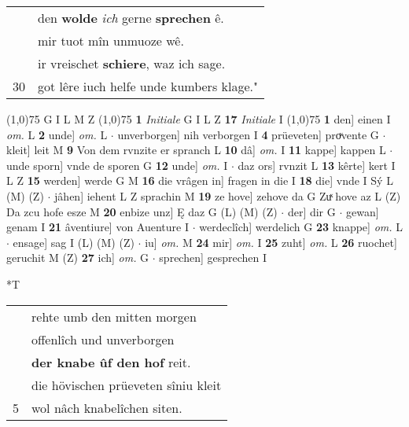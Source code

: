 \documentclass[8pt,a4paper,notitlepage]{article}
\begin{document}
\begin{table}[ht]
\begin{minipage}[t]{0.5\linewidth}
\begin{tabular}{rl}
 & den \textbf{wolde} \textit{ich} gerne \textbf{sprechen} ê.\\ 
 & mir tuot mîn unmuoze wê.\\ 
 & ir vreischet \textbf{schiere}, waz ich sage.\\ 
30 & got lêre iuch helfe unde kumbers klage."\\ 
\end{tabular}
\scriptsize
\line(1,0){75} \newline
G I L M Z \newline
\line(1,0){75} \newline
\textbf{1} \textit{Initiale} G I L Z  \textbf{17} \textit{Initiale} I  \newline
\line(1,0){75} \newline
\textbf{1} den] einen I \textit{om.} L \textbf{2} unde] \textit{om.} L  $\cdot$ unverborgen] nih verborgen I \textbf{4} prüeveten] proͮvente G  $\cdot$ kleit] leit M \textbf{9} Von dem rvnzite er spranch L \textbf{10} dâ] \textit{om.} I \textbf{11} kappe] kappen L  $\cdot$ unde sporn] vnde de sporen G \textbf{12} unde] \textit{om.} I  $\cdot$ daz ors] rvnzit L \textbf{13} kêrte] kert I L Z \textbf{15} werden] werde G M \textbf{16} die vrâgen in] fragen in die I \textbf{18} die] vnde I Sý L (M) (Z)  $\cdot$ jâhen] iehent L Z sprachin M \textbf{19} ze hove] zehove da G Zuͯ hove az L (Z) Da zcu hofe esze M \textbf{20} enbize unz] Ę daz G (L) (M) (Z)  $\cdot$ der] dir G  $\cdot$ gewan] genam I \textbf{21} âventiure] von Auenture I  $\cdot$ werdeclîch] werdelich G \textbf{23} knappe] \textit{om.} L  $\cdot$ ensage] sag I (L) (M) (Z)  $\cdot$ iu] \textit{om.} M \textbf{24} mir] \textit{om.} I \textbf{25} zuht] \textit{om.} L \textbf{26} ruochet] geruchit M (Z) \textbf{27} ich] \textit{om.} G  $\cdot$ sprechen] gesprechen I \newline
\end{minipage}
\hspace{0.5cm}
\begin{minipage}[t]{0.5\linewidth}
\small
\begin{center}*T
\end{center}
\begin{tabular}{rl}
 & rehte umb den mitten morgen\\ 
 & offenlîch und unverborgen\\ 
 & \textbf{der knabe ûf den hof} reit.\\ 
 & die hövischen prüeveten sîniu kleit\\ 
5 & wol nâch knabelîchen siten.\\ 

\end{tabular}
\end{minipage}
\end{table}
\end{document}

